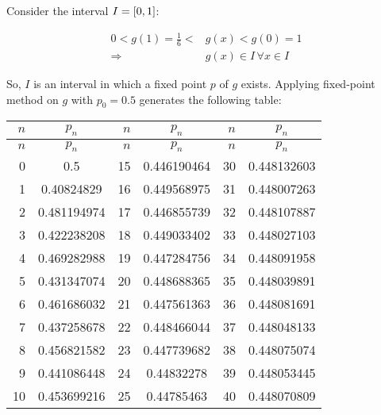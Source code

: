 \documentclass[../../../../Assignments]{subfiles}
\begin{document}
\begin{solution}
\begin{enumerate}[label = \alph*)]
            Consider the interval \(I = \interval{0}{1}\):

            \[\begin{aligned}
                0 < g(1) = \frac{1}{6} < &g(x) < g(0) = 1 \\
                             \Rightarrow &g(x) \in I \, \forall x \in I
            \end{aligned}\]

            So, \(I\) is an interval in which a fixed point \(p\) of \(g\)
            exists. Applying fixed-point method on \(g\) with \(p_0 =
            \num{0.5}\) generates the following table:

            \begin{longtable}{r S[table-format=1.9] r S[table-format=1.9] r S[table-format=1.9]}
                \toprule
                \(n\)  &   {\(p_n\)}   &  \(n\)  &   {\(p_n\)}   &  \(n\)  &   {\(p_n\)}   \\
                \midrule
                \endfirsthead
                \(n\)  &   {\(p_n\)}   &  \(n\)  &   {\(p_n\)}   &  \(n\)  &   {\(p_n\)}   \\
                \midrule
                  &  0.5          &     15  &  0.446190464  &     30  &  0.448132603  \\
                    1  &  0.40824829   &     16  &  0.449568975  &     31  &  0.448007263  \\
                    2  &  0.481194974  &     17  &  0.446855739  &     32  &  0.448107887  \\
                    3  &  0.422238208  &     18  &  0.449033402  &     33  &  0.448027103  \\
                    4  &  0.469282988  &     19  &  0.447284756  &     34  &  0.448091958  \\
                    5  &  0.431347074  &     20  &  0.448688365  &     35  &  0.448039891  \\
                    6  &  0.461686032  &     21  &  0.447561363  &     36  &  0.448081691  \\
                    7  &  0.437258678  &     22  &  0.448466044  &     37  &  0.448048133  \\
                    8  &  0.456821582  &     23  &  0.447739682  &     38  &  0.448075074  \\
                    9  &  0.441086448  &     24  &  0.44832278   &     39  &  0.448053445  \\
                   10  &  0.453699216  &     25  &  0.44785463   &     40  &  0.448070809  \\

\end{longtable}
\end{enumerate}
\end{solution}
\end{document}

